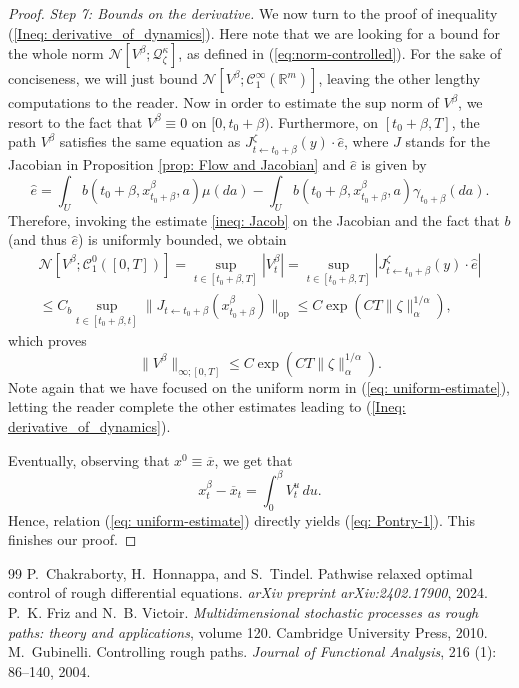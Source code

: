 \documentclass[10pt,a4paper]{amsart}
\newcommand{\R}{\mathbb R}
\newcommand{\ga}{\gamma}
\newcommand{\lp}{\left(}
\newcommand{\rp}{\right)}
\begin{document}
\begin{proof}
\smallskip
\noindent
\textit{Step 7: Bounds on the derivative.} 
We now turn to the proof of inequality (\ref{Ineq: derivative_of_dynamics}). Here note that we are looking for a bound for the whole norm $\mathcal{N}\left[ V^{\beta};\mathcal{Q}_{\zeta}^{\kappa} \right]$, as defined in (\ref{eq:norm-controlled}). For the sake of conciseness, we will just bound $\mathcal{N}[V^{\beta}; \mathcal{C}_{1}^{\infty}(\R^m)]$, leaving the other lengthy computations to the reader. Now in order to estimate the sup norm of $V^{\beta}$, we resort to the fact that $V^{\beta}\equiv 0$ on $[0,t_{0}+\beta)$. Furthermore, on $[t_{0}+\beta,T]$, the path $V^{\beta}$ satisfies the same equation as $J^{\zeta}_{t\leftarrow t_{0}+\beta}(y)\cdot \hat{e}$, where $J$ stands for the Jacobian in Proposition \ref{prop: Flow and Jacobian} and $\hat{e}$ is given by
\begin{equation}
   \hat{e}= \int_{U}b(t_{0}+\beta,x^{\beta}_{t_{0}+\beta},a)\mu(da)-\int_{U}b(t_{0}+\beta,x^{\beta}_{t_{0}+\beta},a)\ga_{t_{0}+\beta}(da) .
\end{equation}
Therefore, invoking the estimate \eqref{ineq: Jacob} on the Jacobian and the fact that $b$ (and thus $\hat{e}$) is uniformly bounded, we obtain
\begin{multline*}
   \mathcal{N}[V^{\beta};\mathcal{C}_{1}^{0}([0,T])]=\sup_{t\in[t_{0}+\beta,T]}|V^{\beta}_{t}|
    =\sup_{t\in[t_{0}+\beta,T]}|J_{t\leftarrow t_{0}+\beta}^{\zeta}(y)\cdot \hat{e}|\\
   \leq C_{b}\sup_{t\in[t_{0}+\beta,t]}\|J_{t\leftarrow t_{0}+\beta}(x^{\beta}_{t_{0}+\beta})\|_{\mathrm{op}}
    \leq C\exp\lp CT\|\zeta\|_{\alpha}^{1/\alpha} \rp,
    \end{multline*} 
    which proves
    \begin{equation}\|V^{\beta}\|_{\infty;[0,T]}\leq C\exp \lp C T \|\zeta\|_{\alpha}^{1/\alpha} \rp.
\label{eq: uniform-estimate}    \end{equation}
Note again that we have focused on the uniform norm in (\ref{eq: uniform-estimate}), letting the reader complete the other estimates leading to (\ref{Ineq: derivative_of_dynamics}).

Eventually, observing that $x^{0}\equiv \overline{x}$, we get that 
\begin{equation}\label{eq: FTC x}x^{\beta}_{t}-\overline{x}_{t}=\int_{0}^{\beta}V_{t}^{u} \, du.\end{equation}
Hence, relation (\ref{eq: uniform-estimate}) directly yields (\ref{eq: Pontry-1}). This finishes our proof.\end{proof}

\begin{thebibliography}{99}
 P.~Chakraborty, H.~Honnappa, and S.~Tindel. \newblock Pathwise relaxed optimal control of rough differential equations. \newblock \emph{arXiv preprint arXiv:2402.17900}, 2024.
 P.~K. Friz and N.~B. Victoir. \newblock \emph{Multidimensional stochastic processes as rough paths: theory and applications}, volume 120. \newblock Cambridge University Press, 2010.
 M.~Gubinelli. \newblock Controlling rough paths. \newblock \emph{Journal of Functional Analysis}, 216 (1): 86--140, 2004.
\end{thebibliography}
\end{document}
